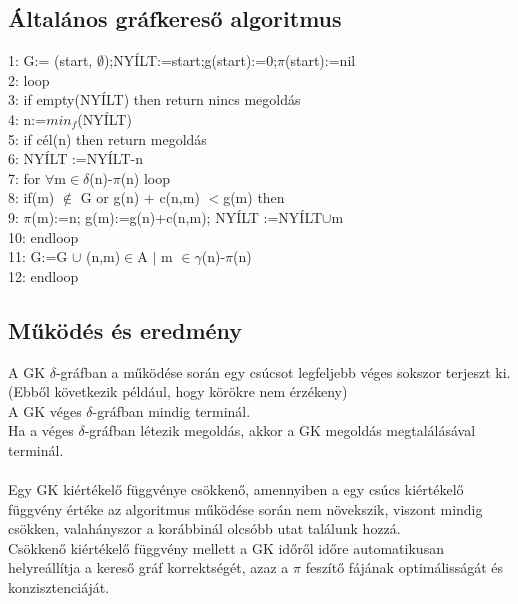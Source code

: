 \documentclass{article}
\begin{document}
	 \subsection{Általános gráfkereső algoritmus}
	 1: G:= ({start}, $\emptyset$);NYÍLT:={start};g(start):=0;$\pi$(start):=nil\\
	 2: loop\\
	 3: \hspace{1em} if empty(NYÍLT) then return nincs megoldás\\
	 4: \hspace{1em} n:=$min_f$(NYÍLT) \\
	 5: \hspace{1em} if cél(n) then return megoldás\\
	 6: \hspace{1em} NYÍLT :=NYÍLT-{n}\\
	 7: \hspace{1em} for $\forall$m$\in$$\delta$(n)-$\pi$(n) loop\\
	 8: \hspace{2em} if(m) $\notin$ G or g(n) + c(n,m) $<$g(m) then\\
	 9: \hspace{3em} $\pi$(m):=n; g(m):=g(n)+c(n,m); NYÍLT :=NYÍLT$\cup${m}\\
	 10:\hspace{1em} endloop\\
	 11:\hspace{1em} G:=G $\cup$ {(n,m)$\in$A $|$ m $\in$$\gamma$(n)-$\pi$(n)}\\
	 12: endloop
	 
	 \subsection{Működés és eredmény}
	 A GK $\delta$-gráfban a működése során egy csúcsot legfeljebb véges sokszor terjeszt ki. (Ebből következik például, hogy körökre nem érzékeny)\\
	 A GK véges $\delta$-gráfban mindig terminál.\\
	 Ha a véges $\delta$-gráfban létezik megoldás, akkor a GK megoldás megtalálásával terminál.\\ \\
	 Egy GK kiértékelő függvénye csökkenő, amennyiben a egy csúcs kiértékelő függvény értéke az algoritmus működése során nem növekszik, viszont mindig csökken, valahányszor a korábbinál olcsóbb utat találunk hozzá. \\
	 Csökkenő kiértékelő függvény mellett a GK időről időre automatikusan helyreállítja a kereső gráf korrektségét, azaz a $\pi$ feszítő fájának optimálisságát és konzisztenciáját.\\
	 
\end{document}
